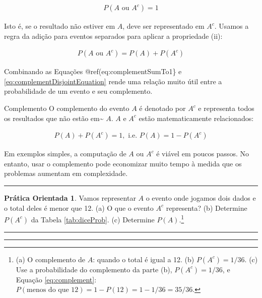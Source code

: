\documentclass[
]{book}
\theoremstyle{definition}
\theoremstyle{definition}
\theoremstyle{definition}
\newtheorem{exercise}{Prática Orientada}[chapter]
\theoremstyle{definition}
\theoremstyle{remark}
\begin{document}
\begin{eqnarray}
P(A\text{ ou }A^c) = 1
\label{eq:complementSumTo1}
\end{eqnarray}

Isto é, se o resultado não estiver em \(A\), deve ser representado em \(A^c\). Usamos a regra da adição para eventos separados para aplicar a propriedade (ii):

\begin{eqnarray}
P(A\text{ ou }A^c) = P(A) + P(A^c)
\label{eq:complementDisjointEquation}
\end{eqnarray}

Combinando as Equações @ref(eq:complementSumTo1\} e \eqref{eq:complementDisjointEquation} rende uma relação muito útil entre a probabilidade de um evento e seu complemento.

Complemento O complemento do evento \(A\) é denotado por \(A^c\) e representa todos os resultados que não estão em\textasciitilde{} \(A\). \(A\) e \(A^c\) estão matematicamente relacionados:

\begin{eqnarray}
P(A) + P(A^c) = 1, \text{ i.e. } P(A) = 1-P(A^c)
\label{eq:complement}
\end{eqnarray}

Em exemplos simples, a computação de \(A\) ou \(A^c\) é viável em poucos passos. No entanto, usar o complemento pode economizar muito tempo à medida que os problemas aumentam em complexidade.

\begin{center}\rule{0.5\linewidth}{0.5pt}\end{center}

\begin{exercise}
\protect\hypertarget{exr:unnamed-chunk-53}{}{\label{exr:unnamed-chunk-53} }Vamos representar \(A\) o evento onde jogamos dois dados e o total deles é menor que 12.
(a) O que o evento \(A^c\) representa?
(b) Determine \(P(A^c)\) da Tabela \ref{tab:diceProb}.
(c) Determine \(P(A)\).\footnote{(a) O complemento de \(A\): quando o total é igual a 12. (b) \(P(A^c) = 1/36\). (c) Use a probabilidade do complemento da parte (b), \(P(A^c) = 1/36\), e Equação \eqref{eq:complement}: \(P(\text{menos do que }12) = 1 - P(12) = 1 - 1/36 = 35/36\).}
\end{exercise}

\begin{center}\rule{0.5\linewidth}{0.5pt}\end{center}

\begin{center}\rule{0.5\linewidth}{0.5pt}\end{center}
\end{document}
